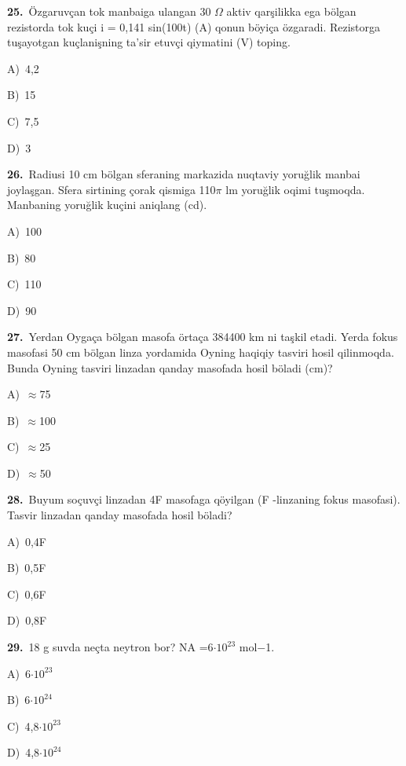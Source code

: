 \documentclass[11pt,a4paper]{article}
\newcommand{\opt}[2]{\hspace*{4mm}#1)\ #2\par}
\begin{document}
\noindent\begin{minipage}{\linewidth}
\textbf{25.}\ Özgaruvçan tok manbaiga ulangan 30 $\Omega$ aktiv qarşilikka ega bölgan rezistorda tok kuçi i = 0,141 sin(100t) (A) qonun böyiça özgaradi. Rezistorga tuşayotgan kuçlanişning ta’sir etuvçi qiymatini (V) toping.\par\smallskip
\opt{A}{4,2}
\opt{B}{15}
\opt{C}{7,5}
\opt{D}{3}
\end{minipage}\vspace{9pt}\par
\noindent\begin{minipage}{\linewidth}
\textbf{26.}\ Radiusi 10 cm bölgan sferaning markazida nuqtaviy yoruğlik manbai joylaşgan. Sfera sirtining çorak qismiga 110$\pi$ lm yoruğlik oqimi tuşmoqda. Manbaning yoruğlik kuçini aniqlang (cd).\par\smallskip
\opt{A}{100}
\opt{B}{80}
\opt{C}{110}
\opt{D}{90}
\end{minipage}\vspace{9pt}\par
\noindent\begin{minipage}{\linewidth}
\textbf{27.}\ Yerdan Oygaça bölgan masofa örtaça 384400 km ni taşkil etadi. Yerda fokus masofasi 50 cm bölgan linza yordamida Oyning haqiqiy tasviri hosil qilinmoqda. Bunda Oyning tasviri linzadan qanday masofada hosil böladi (cm)?\par\smallskip
\opt{A}{$\approx$75}
\opt{B}{$\approx$100}
\opt{C}{$\approx$25}
\opt{D}{$\approx$50}
\end{minipage}\vspace{9pt}\par
\noindent\begin{minipage}{\linewidth}
\textbf{28.}\ Buyum soçuvçi linzadan 4F masofaga qöyilgan (F -linzaning fokus masofasi). Tasvir linzadan qanday masofada hosil böladi?\par\smallskip
\opt{A}{0,4F}
\opt{B}{0,5F}
\opt{C}{0,6F}
\opt{D}{0,8F}
\end{minipage}\vspace{9pt}\par
\noindent\begin{minipage}{\linewidth}
\textbf{29.}\ 18 g suvda neçta neytron bor? NA =6$\cdot10^{23}$ mol$-$1.\par\smallskip
\opt{A}{6$\cdot10^{23}$}
\opt{B}{6$\cdot10^{24}$}
\opt{C}{4,8$\cdot10^{23}$}
\opt{D}{4,8$\cdot10^{24}$}
\end{minipage}\vspace{9pt}\par
\end{document}
